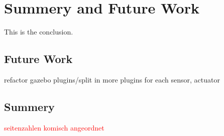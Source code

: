\chapter{Summery and Future Work}
\label{cha:summery_and_future_work}

This is the conclusion.

\section{Future Work}

refactor gazebo plugins/split in more plugins for each sensor, actuator

\section{Summery}

\textcolor{red}{seitenzahlen komisch angeordnet}
